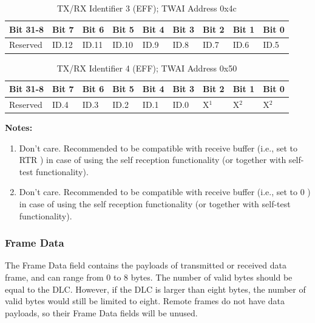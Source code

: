 \documentclass[main\_\_EN.tex]{subfiles}
\begin{document}
\begin{longtable}[c]{|p{1.4cm}|p{1.4cm}|p{1.4cm}|p{1.4cm}|p{1.4cm}|p{1.4cm}|p{1.4cm}|p{1.4cm}|p{1.4cm}|}
    \caption{TX/RX Identifier 3 (EFF); TWAI Address 0x4c}
    \label{tab:twai-tx-rx-identifier-3-eff}\\
    \hline
       \rowcolor{lightgray}
    \textbf{Bit 31-8} & \textbf{Bit 7} & \textbf{Bit 6} & \textbf{Bit 5} & \textbf{Bit 4} & \textbf{Bit 3} & \textbf{Bit 2} & \textbf{Bit 1} & \textbf{Bit 0}\\\hline 
    Reserved & ID.12 & ID.11 & ID.10 & ID.9 & ID.8 & ID.7 & ID.6 & ID.5\\
    \hline
\end{longtable}

\begin{longtable}[c]{|p{1.4cm}|p{1.4cm}|p{1.4cm}|p{1.4cm}|p{1.4cm}|p{1.4cm}|p{1.4cm}|p{1.4cm}|p{1.4cm}|}
    \caption{TX/RX Identifier 4 (EFF); TWAI Address 0x50}
    \label{tab:twai-tx-rx-identifier-4-eff}\\
    \hline
       \rowcolor{lightgray}
    \textbf{Bit 31-8} & \textbf{Bit 7} & \textbf{Bit 6} & \textbf{Bit 5} & \textbf{Bit 4} & \textbf{Bit 3} & \textbf{Bit 2} & \textbf{Bit 1} & \textbf{Bit 0}\\\hline
    Reserved & ID.4 & ID.3 & ID.2 & ID.1 & ID.0 & X$^1$ & X$^2$ & X$^2$\\
    \hline
\end{longtable}
\vspace{-1.5em}
{\bfseries Notes:}\\
\begin{enumerate}
    \item Don’t care. Recommended to be compatible with receive buffer (i.e., set to RTR ) in case of using the self reception functionality (or together with self-test functionality).
    \item Don’t care. Recommended to be compatible with receive buffer (i.e., set to 0 ) in case of using the self reception functionality (or together with self-test functionality). 
\end{enumerate}

\subsubsection{Frame Data}
The Frame Data field contains the payloads of transmitted or received data frame, and can range from 0 to 8 bytes. The number of valid bytes should be equal to the DLC. However, if the DLC is larger than eight bytes, the number of valid bytes would still be limited to eight. Remote frames do not have data payloads, so their Frame Data fields will be unused.
\end{document}
